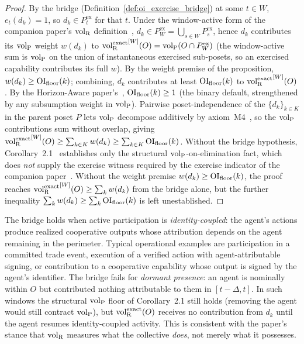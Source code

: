 \begin{proof}
By the bridge (Definition~\ref{def:oi_exercise_bridge}) at some
$t \in W$, $e_t(d_k) = 1$, so $d_k \in P^{\mathrm{ex}}_t$ for
that $t$.  Under the window-active form of the companion
paper's ${\operatorname{vol}_{\mathrm{R}}}$ definition~\citep[Revealed~Sacrifice]{lasser2026paper8a}, $d_k \in
P^{\mathrm{ex}}_W = \bigcup_{s \in W} P^{\mathrm{ex}}_s$, hence
$d_k$ contributes its ${\operatorname{vol}_{\mathrm{P}}}$ weight $w(d_k)$ to
${\operatorname{vol}_{\mathrm{R}}^{\mathrm{exact}}}^{[W]}(O) = {\operatorname{vol}_{\mathrm{P}}}(O \cap P^{\mathrm{ex}}_W)$ (the
window-active sum is ${\operatorname{vol}_{\mathrm{P}}}$ on the union of instantaneous
exercised sub-posets, so an exercised capability contributes
its full $w$).  By the weight premise of the proposition,
$w(d_k) \geq \mathrm{OI}_{\mathrm{floor}}(k)$; combining,
$d_k$ contributes at least $\mathrm{OI}_{\mathrm{floor}}(k)$ to
${\operatorname{vol}_{\mathrm{R}}^{\mathrm{exact}}}^{[W]}(O)$.  By
the Horizon-Aware paper's~\citep[Corollary~2.1]{lasser2026horizon},
$\mathrm{OI}_{\mathrm{floor}}(k) \geq 1$ (the binary default, strengthened by any
subsumption weight in ${\operatorname{vol}_{\mathrm{P}}}$).  Pairwise poset-independence of
the $\{d_k\}_{k \in K}$ in the parent poset $P$ lets ${\operatorname{vol}_{\mathrm{P}}}$
decompose additively by
axiom~M4~\citep[Proposition~1]{lasser2026poset}, so the
${\operatorname{vol}_{\mathrm{P}}}$ contributions sum without overlap, giving
${\operatorname{vol}_{\mathrm{R}}^{\mathrm{exact}}}^{[W]}(O) \geq \sum_{k \in K} w(d_k) \geq
\sum_{k \in K} \mathrm{OI}_{\mathrm{floor}}(k)$.  Without the bridge hypothesis,
Corollary~2.1~\citep[Horizon~Aware]{lasser2026horizon} establishes only the
structural ${\operatorname{vol}_{\mathrm{P}}}$-on-elimination fact, which does \emph{not}
supply the exercise witness required by the exercise indicator
of the companion paper~\citep[Revealed~Sacrifice]{lasser2026paper8a}.  Without the
weight premise $w(d_k) \geq \mathrm{OI}_{\mathrm{floor}}(k)$, the proof reaches
${\operatorname{vol}_{\mathrm{R}}^{\mathrm{exact}}}^{[W]}(O) \geq \sum_{k} w(d_k)$ from the bridge
alone, but the further inequality
$\sum_k w(d_k) \geq \sum_k \mathrm{OI}_{\mathrm{floor}}(k)$ is left unestablished.
\end{proof}

\begin{remark}
\label{rem:oi_bridge_scope}
The bridge holds when active participation is
\emph{identity-coupled}: the agent's actions produce realized
cooperative outputs whose attribution depends on the agent
remaining in the perimeter.  Typical operational examples are
participation in a committed trade event, execution of a
verified action with agent-attributable signing, or
contribution to a cooperative capability whose output is signed
by the agent's identifier.  The bridge fails for \emph{dormant
presence}: an agent is nominally within $O$ but contributed
nothing attributable to them in $[t-\Delta, t]$.  In such
windows the structural ${\operatorname{vol}_{\mathrm{P}}}$ floor of Corollary~2.1 still
holds (removing the agent would still contract ${\operatorname{vol}_{\mathrm{P}}}$), but
${\operatorname{vol}_{\mathrm{R}}^{\mathrm{exact}}}(O)$ receives no contribution from $d_k$ until the
agent resumes identity-coupled activity.  This is consistent
with the paper's stance that ${\operatorname{vol}_{\mathrm{R}}}$ measures what the
collective \emph{does}, not merely what it possesses.
\end{remark}

